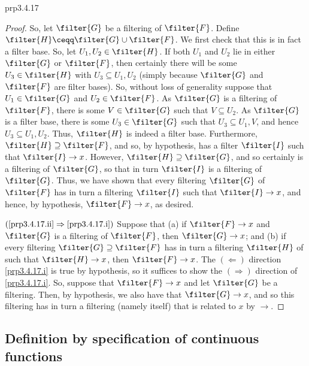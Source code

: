 \begin{prp}{}{prp3.4.17}
\begin{proof}
So, let $\filter{G}$ be a filtering of $\filter{F}$.  Define $\filter{H}\ceqq \filter{G}\cup \filter{F}$.  We first check that this is in fact a filter base.  So, let $U_1,U_2\in \filter{H}$.  If both $U_1$ and $U_2$ lie in either $\filter{G}$ or $\filter{F}$, then certainly there will be some $U_3\in \filter{H}$ with $U_3\subseteq U_1,U_2$ (simply because $\filter{G}$ and $\filter{F}$ are filter bases).  So, without loss of generality suppose that $U_1\in \filter{G}$ and $U_2\in \filter{F}$.  As $\filter{G}$ is a filtering of $\filter{F}$, there is some $V\in \filter{G}$ such that $V\subseteq U_2$.  As $\filter{G}$ is a filter base, there is some $U_3\in \filter{G}$ such that $U_3\subseteq U_1,V$, and hence $U_3\subseteq U_1,U_2$.  Thus, $\filter{H}$ is indeed a filter base.  Furthermore, $\filter{H}\supseteq \filter{F}$, and so, by hypothesis, has a filter $\filter{I}$ such that $\filter{I}\to x$.  However, $\filter{H}\supseteq \filter{G}$, and so certainly is a filtering of $\filter{G}$, so that in turn $\filter{I}$ is a filtering of $\filter{G}$.  Thus, we have shown that every filtering $\filter{G}$ of $\filter{F}$ has in turn a filtering $\filter{I}$ such that $\filter{I}\to x$, and hence, by hypothesis, $\filter{F}\to x$, as desired.

\blankline
\noindent
$(\cref{prp3.4.17.ii}\Rightarrow \cref{prp3.4.17.i})$ Suppose that (a) if $\filter{F}\to x$ and $\filter{G}$ is a filtering of $\filter{F}$, then $\filter{G}\to x$; and (b) if every filtering $\filter{G}\supseteq \filter{F}$ has in turn a filtering $\filter{H}$ of such that $\filter{H}\to x$, then $\filter{F}\to x$.  The $(\Leftarrow )$ direction \cref{prp3.4.17.i} is true by hypothesis, so it suffices to show the $(\Rightarrow )$ direction of \cref{prp3.4.17.i}.  So, suppose that $\filter{F}\to x$ and let $\filter{G}$ be a filtering.  Then, by hypothesis, we also have that $\filter{G}\to x$, and so this filtering has in turn a filtering (namely itself) that is related to $x$ by $\to$.
\end{proof}
\end{prp}

\subsection[Definition by specification of cont.~functions]{Definition by specification of continuous functions}

